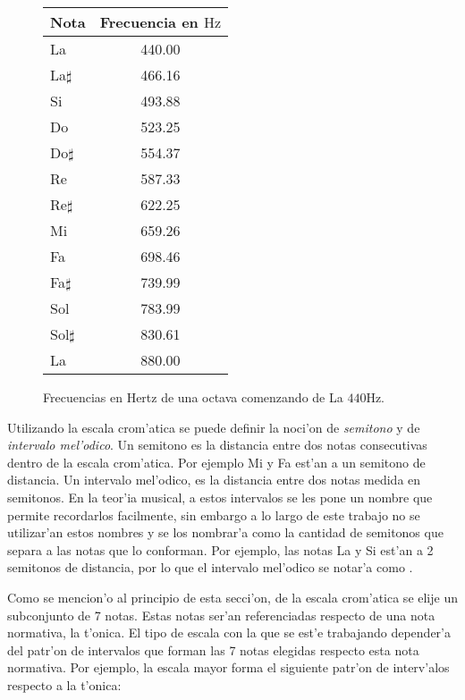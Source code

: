 \begin{figure}
\begin{center}
    \begin{tabular}[c]{|l|c|}
    \hline
    \textbf{Nota} & \textbf{Frecuencia en $\mbox{Hz}$} \\
    \hline 
    La		        &	440.00 \\
    La$\sharp$		&	466.16 \\
    Si	        	&	493.88 \\
    Do	        	&	523.25 \\
    Do$\sharp$      &	554.37 \\
    Re	        	&	587.33 \\
    Re$\sharp$      &	622.25 \\
    Mi	        	&	659.26 \\
    Fa	        	&	698.46 \\
    Fa$\sharp$      &	739.99 \\
    Sol	        	&	783.99 \\
    Sol$\sharp$     &	830.61 \\
    La	        	&	880.00 \\ 
    \hline
    \end{tabular}
 \caption{Frecuencias en Hertz de una octava comenzando de La $440\mbox{Hz}$.}
 \label{tab:cromatica}
\end{center}
\end{figure}


Utilizando la escala crom'atica se puede definir la noci'on de \emph{semitono} y de \emph{intervalo mel'odico}. Un semitono es la distancia
entre dos notas consecutivas dentro de la escala crom'atica. Por ejemplo Mi y Fa est'an a un semitono de distancia. Un intervalo mel'odico, 
es la distancia entre dos notas medida en semitonos. En la teor'ia musical, a estos intervalos se les pone un nombre que permite recordarlos 
facilmente, sin embargo a lo largo de este trabajo no se utilizar'an estos nombres y se los nombrar'a como la cantidad de semitonos que separa
a las notas que lo conforman. Por ejemplo, las notas La y Si est'an a 2 semitonos de distancia, por lo que el intervalo mel'odico
se notar'a como . 

Como se mencion'o al principio de esta secci'on, de la escala crom'atica se elije un subconjunto de 7 notas. Estas notas ser'an referenciadas
respecto de una nota normativa, la t'onica. El tipo de escala con la que se est'e trabajando depender'a del patr'on de intervalos que 
forman las 7 notas elegidas respecto esta nota normativa. Por ejemplo, la escala mayor forma el siguiente patr'on de interv'alos respecto a la t'onica:

